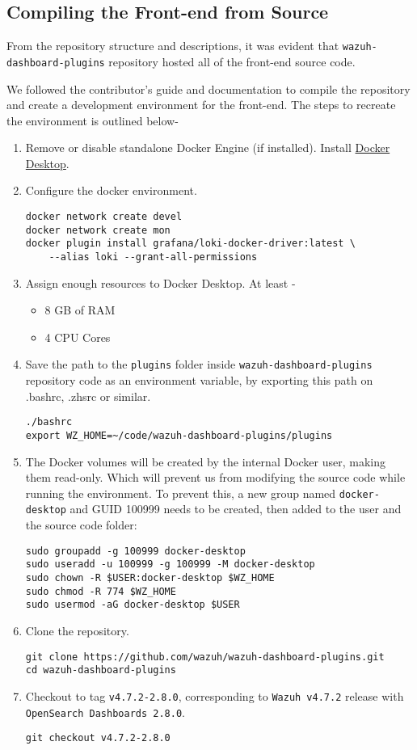 \subsection{Compiling the Front-end from Source}
From the repository structure and descriptions, it was evident that \texttt{wazuh-dashboard-plugins} repository hosted all of the front-end source code.

We followed the contributor's guide and documentation to compile the repository and create a development environment for the front-end. The steps to recreate the environment is outlined below-

\begin{enumerate}
    \item Remove or disable standalone Docker Engine (if installed). Install \href{https://docs.docker.com/get-docker/}{Docker Desktop}.
    \item Configure the docker environment.
    \begin{verbatim}
docker network create devel
docker network create mon
docker plugin install grafana/loki-docker-driver:latest \
    --alias loki --grant-all-permissions
    \end{verbatim}
    \item Assign enough resources to Docker Desktop. At least -
    \begin{itemize}
        \item 8 GB of RAM
        \item 4 CPU Cores
    \end{itemize}
    \item Save the path to the \texttt{plugins} folder inside \texttt{wazuh-dashboard-plugins} repository code as an environment variable, by exporting this path on .bashrc, .zhsrc or similar.
    \begin{verbatim}
./bashrc
export WZ_HOME=~/code/wazuh-dashboard-plugins/plugins
    \end{verbatim}
    \item The Docker volumes will be created by the internal Docker user, making them read-only. Which will prevent us from modifying the source code while running the environment. To prevent this, a new group named \texttt{docker-desktop} and GUID 100999 needs to be created, then added to the user and the source code folder:
    \begin{verbatim}
sudo groupadd -g 100999 docker-desktop
sudo useradd -u 100999 -g 100999 -M docker-desktop
sudo chown -R $USER:docker-desktop $WZ_HOME
sudo chmod -R 774 $WZ_HOME
sudo usermod -aG docker-desktop $USER
    \end{verbatim}
    \item Clone the repository.
    \begin{verbatim}
git clone https://github.com/wazuh/wazuh-dashboard-plugins.git
cd wazuh-dashboard-plugins
    \end{verbatim}
    \item Checkout to tag \texttt{v4.7.2-2.8.0}, corresponding to \texttt{Wazuh v4.7.2} release with \texttt{OpenSearch Dashboards 2.8.0}.
    \begin{verbatim}
git checkout v4.7.2-2.8.0
    \end{verbatim}


\end{enumerate}
